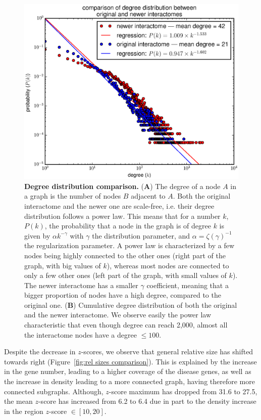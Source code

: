 \documentclass[letterpaper]{article}
\begin{document}
	\begin{figure}[!b]
		\hspace{-1.8cm}
		\vspace{-.5cm}
		\includegraphics[scale=.36]{images/degree_distributions_comparison.eps}
		\caption{{\bf Degree distribution comparison.} ({\bf A}) The degree of a node $A$ in a graph is the number of nodes
		$B$ adjacent to $A$. Both the original interactome and the newer one are scale-free, i.e. their degree distribution
		follows a power law. This means that for a number $k$, $P(k)$, the probability that a node in the graph is of degree
		$k$ is given by $\alpha k^{-\gamma}$ with $\gamma$ the distribution parameter, and $\alpha = \zeta(\gamma)^{-1}$
		the regularization parameter. A power law is characterized by a few nodes being highly connected to the other ones
		(right part of the graph, with big values of $k$), whereas most nodes are connected to only a few other ones (left
		part of the graph, with small values of $k$). The newer interactome has a smaller $\gamma$ coefficient, meaning that
		a bigger proportion of nodes have a high degree, compared to the original one.
		({\bf B}) Cumulative degree distribution of both the original and the newer interactome. We observe easily the power
		law characteristic that even though degree can reach 2,000, almost all the interactome nodes have a degree $\leq 100$.
		\label{fig:degree distribution comparison}}
	\end{figure}

	Despite the decrease in $z$-scores, we observe that general relative size has shifted towards right
	(Figure~\ref{fig:rel sizes comparison}).
	This is explained by the increase in the gene number, leading to a higher coverage of the disease genes, as well as
	the increase in density leading to a more connected graph, having therefore more connected subgraphs. Although,
	$z$-score maximum has dropped from 31.6 to 27.5, the mean $z$-score has increased from 6.2 to 6.4 due in part to the
	density increase in the region $z$-score $\in [10, 20]$.
\end{document}
